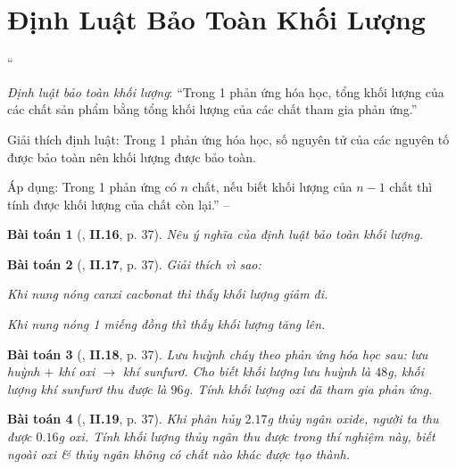 \documentclass{article}
\numberwithin{equation}{section}
\newtheorem{baitoan}{Bài toán}
\begin{document}
\section{Định Luật Bảo Toàn Khối Lượng}
``\begin{enumerate*}
	\item[\textbf{1.}] \textit{Định luật bảo toàn khối lượng}: ``Trong 1 phản ứng hóa học, tổng khối lượng của các chất sản phẩm bằng tổng khối lượng của các chất tham gia phản ứng.''
	\item[\textbf{2.}] Giải thích định luật: Trong 1 phản ứng hóa học, số nguyên tử của các nguyên tố được bảo toàn nên khối lượng được bảo toàn.
	\item[\textbf{3.}] Áp dụng: Trong 1 phản ứng có $n$ chất, nếu biết khối lượng của $n - 1$ chất thì tính được khối lượng của chất còn lại.'' -- \cite[p. 37]{Truong_BTNC_Hoa_Hoc_8_2022}
\end{enumerate*}

\begin{baitoan}[\cite{Truong_BTNC_Hoa_Hoc_8_2022}, \textbf{II.16}, p. 37]
	Nêu ý nghĩa của định luật bảo toàn khối lượng.
\end{baitoan}

\begin{baitoan}[\cite{Truong_BTNC_Hoa_Hoc_8_2022}, \textbf{II.17}, p. 37]
	Giải thích vì sao:
	\begin{enumerate*}
		\item[(a)] Khi nung nóng canxi cacbonat \emph{} thì thấy khối lượng giảm đi.
		\item[(b)] Khi nung nóng 1 miếng đồng thì thấy khối lượng tăng lên.
	\end{enumerate*}
\end{baitoan}

\begin{baitoan}[\cite{Truong_BTNC_Hoa_Hoc_8_2022}, \textbf{II.18}, p. 37]
	Lưu huỳnh cháy theo phản ứng hóa học sau: lưu huỳnh $+$ khí oxi $\to$ khí sunfurơ. Cho biết khối lượng lưu huỳnh là $48$\emph{g}, khối lượng khí sunfurơ thu được là $96$\emph{g}. Tính khối lượng oxi đã tham gia phản ứng.
\end{baitoan}

\begin{baitoan}[\cite{Truong_BTNC_Hoa_Hoc_8_2022}, \textbf{II.19}, p. 37]
	Khi phân hủy $2.17$\emph{g} thủy ngân oxide, người ta thu được $0.16$\emph{g} oxi. Tính khối lượng thủy ngân thu được trong thí nghiệm này, biết ngoài oxi \& thủy ngân không có chất nào khác được tạo thành.
\end{baitoan}
\end{document}
